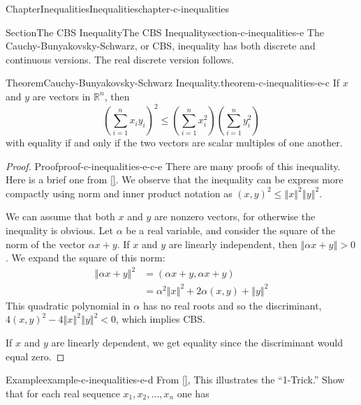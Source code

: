 \documentclass[oneside,10pt,]{book}
\newcommand{\xreffont}{\relax}
\numberwithin{equation}{section}
\newcommand{\lt}{<}
\newcommand{\gt}{>}
\begin{document}
\begin{chapterptx}{Chapter}{Inequalities}{}{Inequalities}{}{}{chapter-c-inequalities}
%
\begin{sectionptx}{Section}{The CBS Inequality}{}{The CBS Inequality}{}{}{section-c-inequalities-e}
The Cauchy-Bunyakovsky-Schwarz, or CBS, inequality has both discrete and continuous versions.  The real discrete version follows.%
\begin{theorem}{Theorem}{Cauchy-Bunyakovsky-Schwarz Inequality.}{}{theorem-c-inequalities-e-c}%
%
%
If \(x\) and \(y\) are vectors in \(\mathbb{R}^n\), then%
\begin{equation}
\left(\sum _{i=1}^n x_i y_i\right)^2\leq \left(\sum _{i=1}^n x_i^2\right)\left(
\sum _{i=1}^n y_i^2\right)\label{men-eq-cbs}
\end{equation}
with equality if and only if the two vectors are scalar multiples of one another.%
\end{theorem}
\begin{proof}{Proof}{}{proof-c-inequalities-e-c-e}
There are many proofs of this inequality.  Here is a brief one from \hyperlink{biblio-biblio-aigner}{[{\xreffont 1}]}. We observe that the inequality can be express more compactly using norm and inner product notation as \((x, y)^2 \leq \left\Vert x \right\Vert^2 \left\Vert y \right\Vert^2 \).%
\par
We can assume that both \(x\) and \(y\) are nonzero vectors, for otherwise the inequality is obvious.  Let \(\alpha\) be a real variable, and consider the square of the norm of the vector \(\alpha x + y\).  If \(x\) and \(y\) are linearly independent, then \(\left\Vert \alpha x + y\right\Vert \gt 0\).  We expand the square of this norm:%
\begin{equation*}
\begin{split}
\left\Vert \alpha x + y \right\Vert^2 &= (\alpha x + y,\alpha x + y)\\
&  = \alpha^2 \left\Vert x \right\Vert^2 + 2 \alpha (x, y) + \left\Vert y \right\Vert^2
\end{split}
\end{equation*}
This quadratic polynomial in \(\alpha\) has no real roots and so the discriminant, \(4 (x, y)^2 - 4\left\Vert x \right\Vert^2 \left\Vert y \right\Vert^2 \lt 0\), which implies CBS.%
\par
If  \(x\) and \(y\) are linearly dependent, we get equality since the discriminant would equal zero.%
\end{proof}
\begin{example}{Example}{}{example-c-inequalities-e-d}%
From \hyperlink{biblio-biblio-steele-2004}{[{\xreffont 15}]}, This illustrates the ``1-Trick.''  Show that for each real sequence \(x_1, x_2, \dots, x_n\) one has%

\end{example}
\end{sectionptx}
\end{chapterptx}
\end{document}
